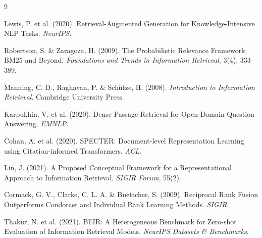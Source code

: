 \documentclass[12pt]{article}
\begin{document}
\begin{thebibliography}{9}

Lewis, P. et al. (2020). Retrieval-Augmented Generation for Knowledge-Intensive NLP Tasks. \textit{NeurIPS}.

Robertson, S. \& Zaragoza, H. (2009). The Probabilistic Relevance Framework: BM25 and Beyond. \textit{Foundations and Trends in Information Retrieval}, 3(4), 333--389.

Manning, C. D., Raghavan, P. \& Schütze, H. (2008). \textit{Introduction to Information Retrieval}. Cambridge University Press.

Karpukhin, V. et al. (2020). Dense Passage Retrieval for Open-Domain Question Answering. \textit{EMNLP}.

Cohan, A. et al. (2020). SPECTER: Document-level Representation Learning using Citation-informed Transformers. \textit{ACL}.

Lin, J. (2021). A Proposed Conceptual Framework for a Representational Approach to Information Retrieval. \textit{SIGIR Forum}, 55(2).

Cormack, G. V., Clarke, C. L. A. \& Buettcher, S. (2009). Reciprocal Rank Fusion Outperforms Condorcet and Individual Rank Learning Methods. \textit{SIGIR}.

Thakur, N. et al. (2021). BEIR: A Heterogeneous Benchmark for Zero-shot Evaluation of Information Retrieval Models. \textit{NeurIPS Datasets \& Benchmarks}.

\end{thebibliography}
\end{document}
